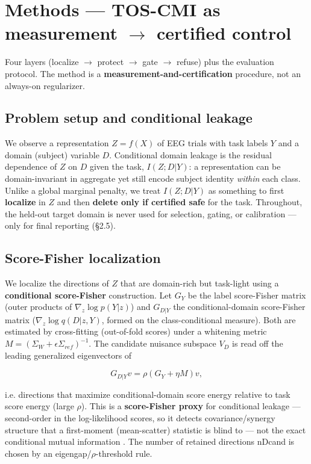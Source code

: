 \section{Methods --- TOS-CMI as measurement $\to$ certified control}

Four layers (localize $\to$ protect $\to$ gate $\to$ refuse) plus
the evaluation protocol. The method is a \textbf{measurement-and-certification} procedure, not an
always-on regularizer.

\subsection{Problem setup and conditional leakage}
We observe a representation $Z = f(X)$ of EEG trials with task labels $Y$ and a domain (subject) variable $D$.
Conditional domain leakage is the residual dependence of $Z$ on $D$ given the task, $I(Z;D|Y)$: a representation
can be domain-invariant in aggregate yet still encode subject identity \emph{within} each class. Unlike a global
marginal penalty, we treat $I(Z;D|Y)$ as something to first \textbf{localize} in $Z$ and then \textbf{delete only if
certified safe} for the task. Throughout, the held-out target domain is never used for selection, gating,
or calibration --- only for final reporting (\S2.5).

\subsection{Score-Fisher localization}
We localize the directions of $Z$ that are domain-rich but task-light using a \textbf{conditional score-Fisher}
construction. Let $G_Y$ be the label score-Fisher matrix (outer products of $\nabla_z \log p(Y|z)$) and $G_{D|Y}$ the
conditional-domain score-Fisher matrix ($\nabla_z \log q(D|z,Y)$, formed on the class-conditional measure). Both are
estimated by cross-fitting (out-of-fold scores) under a whitening metric $M = (\Sigma_W + \epsilon \Sigma_{ref})^{-1}$. The
candidate nuisance subspace $V_D$ is read off the leading generalized eigenvectors of

\begin{equation}
G_{D|Y} v = \rho (G_Y + \eta M) v,
\end{equation}

i.e. directions that maximize conditional-domain score energy relative to task score energy (large $\rho$).
This is a \textbf{score-Fisher proxy} for conditional leakage --- second-order in the log-likelihood scores, so it
detects covariance/synergy structure that a first-moment (mean-scatter) statistic is blind to --- not the
exact conditional mutual information . The number of retained directions nDcand is chosen by an
eigengap/$\rho$-threshold rule.

